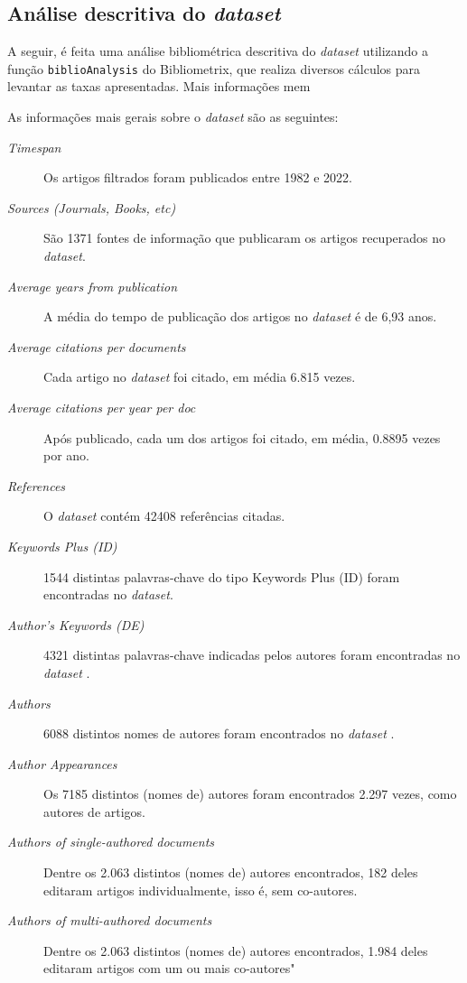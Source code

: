 \subsection{Análise descritiva do \textit{dataset} }

A seguir, é feita uma análise bibliométrica descritiva do \textit{dataset} utilizando a função \texttt{biblioAnalysis} do Bibliometrix, que realiza diversos cálculos para levantar as taxas apresentadas. Mais informações mem 

As informações mais gerais sobre o \textit{dataset} são as seguintes:
\begin{description}
    \item [\textit{Timespan}] Os artigos filtrados foram publicados entre 1982 e 2022.
    \item [\textit{Sources (Journals, Books, etc)}] São 1371 fontes de informação que publicaram os artigos recuperados no \textit{dataset}.
    \item [\textit{Average years from publication}] A média do tempo de publicação dos artigos no \textit{dataset} é de 6,93 anos.
    \item [\textit{Average citations per documents}] Cada artigo no \textit{dataset} foi citado, em média 6.815 vezes.
    \item [\textit{Average citations per year per doc}] Após publicado, cada um dos artigos foi citado, em média, 0.8895 vezes por ano.
    \item [\textit{References}] O \textit{dataset} contém 42408 referências citadas.
    \item [\textit{Keywords Plus (ID)}] 1544 distintas palavras-chave do tipo Keywords Plus (ID) foram encontradas no \textit{dataset}.
    \item [\textit{Author's Keywords (DE)}] 4321 distintas palavras-chave indicadas pelos autores foram encontradas no \textit{dataset} .
    \item [\textit{Authors}] 6088 distintos nomes de autores foram encontrados no \textit{dataset} .
    \item [\textit{Author Appearances}] Os 7185 distintos (nomes de) autores foram encontrados 2.297 vezes, como autores de artigos.
    \item [\textit{Authors of single-authored documents}] Dentre os 2.063 distintos (nomes de) autores encontrados, 182 deles editaram artigos individualmente, isso é, sem co-autores.
    \item [\textit{Authors of multi-authored documents}] Dentre os 2.063 distintos (nomes de) autores encontrados, 1.984 deles editaram artigos com um ou mais co-autores"

\end{description}
